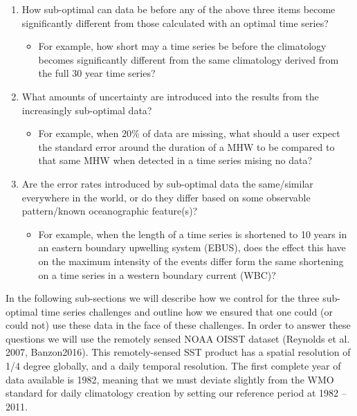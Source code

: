 \documentclass[]{article}
\providecommand{\tightlist}{%
  \setlength{\itemsep}{0pt}\setlength{\parskip}{0pt}}
\begin{document}
\begin{enumerate}
\def\labelenumi{\arabic{enumi})}
\tightlist
\item
  How sub-optimal can data be before any of the above three items become
  significantly different from those calculated with an optimal time
  series?

  \begin{itemize}
  \tightlist
  \item
    For example, how short may a time series be before the climatology
    becomes significantly different from the same climatology derived
    from the full 30 year time series?
  \end{itemize}
\item
  What amounts of uncertainty are introduced into the results from the
  increasingly sub-optimal data?

  \begin{itemize}
  \tightlist
  \item
    For example, when 20\% of data are missing, what should a user
    expect the standard error around the duration of a MHW to be
    compared to that same MHW when detected in a time series mising no
    data?
  \end{itemize}
\item
  Are the error rates introduced by sub-optimal data the same/similar
  everywhere in the world, or do they differ based on some observable
  pattern/known oceanographic feature(s)?

  \begin{itemize}
  \tightlist
  \item
    For example, when the length of a time series is shortened to 10
    years in an eastern boundary upwelling system (EBUS), does the
    effect this have on the maximum intensity of the events differ form
    the same shortening on a time series in a western boundary current
    (WBC)?
  \end{itemize}
\end{enumerate}

In the following sub-sections we will describe how we control for the
three sub-optimal time series challenges and outline how we ensured that
one could (or could not) use these data in the face of these challenges.
In order to answer these questions we will use the remotely sensed NOAA
OISST dataset (Reynolds et al. 2007, Banzon2016). This remotely-sensed
SST product has a spatial resolution of 1/4 degree globally, and a daily
temporal resolution. The first complete year of data available is 1982,
meaning that we must deviate slightly from the WMO standard for daily
climatology creation by setting our reference period at 1982 -- 2011.
\end{document}
